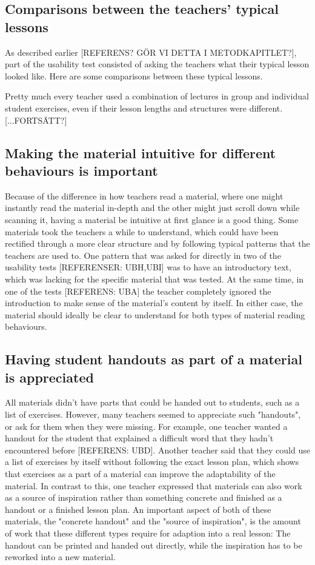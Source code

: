 \subsection{Comparisons between the teachers' typical lessons}
As described earlier [REFERENS? GÖR VI DETTA I METODKAPITLET?], part of the usability test consisted of asking the teachers what their typical lesson looked like. Here are some comparisons between these typical lessons.

Pretty much every teacher used a combination of lectures in group and individual student exercises, even if their lesson lengths and structures were different. [...FORTSÄTT?]

\subsection{Making the material intuitive for different behaviours is important}
Because of the difference in how teachers read a material, where one might instantly read the material in-depth and the other might just scroll down while scanning it, having a material be intuitive at first glance is a good thing. Some materials took the teachers a while to understand, which could have been rectified through a more clear structure and by following typical patterns that the teachers are used to. One pattern that was asked for directly in two of the usability tests [REFERENSER: UBH,UBI] was to have an introductory text, which was lacking for the specific material that was tested. At the same time, in one of the tests [REFERENS: UBA] the teacher completely ignored the introduction to make sense of the material's content by itself. In either case, the material should ideally be clear to understand for both types of material reading behaviours.

\subsection{Having student handouts as part of a material is appreciated}
All materials didn't have parts that could be handed out to students, such as a list of exercises. However, many teachers seemed to appreciate such "handouts", or ask for them when they were missing. For example, one teacher wanted a handout for the student that explained a difficult word that they hadn't encountered before [REFERENS: UBD]. Another teacher said that they could use a list of exercises by itself without following the exact lesson plan, which shows that exercises as a part of a material can improve the adaptability of the material. In contrast to this, one teacher expressed that materials can also work as a source of inspiration rather than something concrete and finished as a handout or a finished lesson plan. An important aspect of both of these materials, the "concrete handout" and the "source of inspiration", is the amount of work that these different types require for adaption into a real lesson: The handout can be printed and handed out directly, while the inspiration has to be reworked into a new material.

